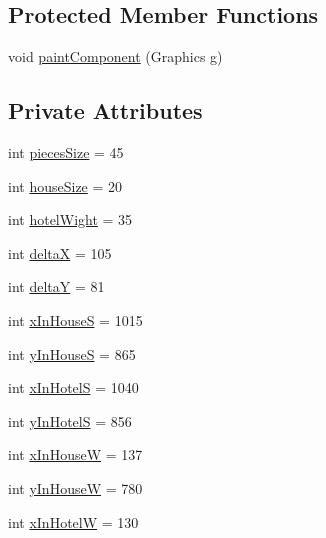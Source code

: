 \subsection*{Protected Member Functions}
\begin{DoxyCompactItemize}
\item 
void \hyperlink{class_monopoly_1_1_gui_1_1_game_panel_a9c5ce2fd23969e5c3ab66a00368c4cfe}{paint\+Component} (Graphics g)
\end{DoxyCompactItemize}
\subsection*{Private Attributes}
\begin{DoxyCompactItemize}
\item 
int \hyperlink{class_monopoly_1_1_gui_1_1_game_panel_ac11a08bb6197d44bd0b1368dff726cc1}{pieces\+Size} = 45
\item 
int \hyperlink{class_monopoly_1_1_gui_1_1_game_panel_a3bb4a7e0aa696f77e52c01a0f3e493a6}{house\+Size} = 20
\item 
int \hyperlink{class_monopoly_1_1_gui_1_1_game_panel_ad91eeac1bbf98443b641ddee031cf753}{hotel\+Wight} = 35
\item 
int \hyperlink{class_monopoly_1_1_gui_1_1_game_panel_a25aba5e7408249f7e52a0864b0969704}{deltaX} = 105
\item 
int \hyperlink{class_monopoly_1_1_gui_1_1_game_panel_a395756de40a57ccd5ac877b216547df8}{deltaY} = 81
\item 
int \hyperlink{class_monopoly_1_1_gui_1_1_game_panel_ab9994c98fba8ce68ccb2907cab4a6061}{x\+In\+HouseS} = 1015
\item 
int \hyperlink{class_monopoly_1_1_gui_1_1_game_panel_aba9060000ece3843dcdb7c7760aa931c}{y\+In\+HouseS} = 865
\item 
int \hyperlink{class_monopoly_1_1_gui_1_1_game_panel_a0a2c505f94592e3fcfdb966a4b4453c4}{x\+In\+HotelS} = 1040
\item 
int \hyperlink{class_monopoly_1_1_gui_1_1_game_panel_a00a465ba8a26800fc06f8e48f8453698}{y\+In\+HotelS} = 856
\item 
int \hyperlink{class_monopoly_1_1_gui_1_1_game_panel_a38bbec0401e172e38b405c4dd1b16ad1}{x\+In\+HouseW} = 137
\item 
int \hyperlink{class_monopoly_1_1_gui_1_1_game_panel_a13b869ff6b15a120ea34a3d49265cd03}{y\+In\+HouseW} = 780
\item 
int \hyperlink{class_monopoly_1_1_gui_1_1_game_panel_a3840570cda6afa9a2d52098814c4da27}{x\+In\+HotelW} = 130

\end{DoxyCompactItemize}
